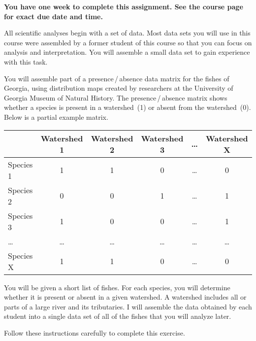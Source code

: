 \documentclass[12pt]{exam}
\begin{document}
\textbf{You have one week to complete this assignment. See the course page for exact due date and time.}

All scientific analyses begin with a set of data. Most data sets 
you will use in this course were assembled by a former student
of this course so that you can focus on analysis and interpretation. You 
will assemble a small data set to gain 
experience with this task.

You will assemble part of a presence\,/\,absence data matrix for 
the fishes of Georgia, using distribution maps created by 
researchers at the University of Georgia Museum of Natural 
History. The presence\,/\,absence matrix shows whether a species is 
present in a watershed~(1) or absent from the watershed~(0). 
Below is a partial example matrix.

\begin{longtable}[]{@{}lccccc@{}}
\toprule
& Watershed 1 & Watershed 2 & Watershed 3 & \ldots{} & Watershed
X\tabularnewline
\midrule
\endhead
Species 1 & 1 & 1 & 0 & \ldots{} & 0\tabularnewline
Species 2 & 0 & 0 & 1 & \ldots{} & 1\tabularnewline
Species 3 & 1 & 0 & 0 & \ldots{} & 1\tabularnewline
\ldots{} & \ldots{} & \ldots{} & \ldots{} & \ldots{} &
\ldots{}\tabularnewline
Species X & 1 & 1 & 0 & \ldots{} & 0\tabularnewline
\bottomrule
\end{longtable}

You will be given a short list of fishes. For each species, you 
will determine whether it is present or absent in a given 
watershed. A watershed includes all or parts of a large river and 
its tributaries. I will assemble the data obtained by each 
student into a single data set of all of the fishes that 
you will analyze later.

Follow these instructions carefully to complete this
exercise.
\end{document}
